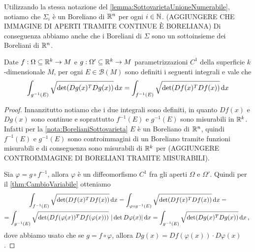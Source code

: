 \begin{remark}\label{nota:BorelianiSottovarieta}
	Utilizzando la stessa notazione del \cref{lemma:SottovarietaUnioneNumerabile}, notiamo che $\Sigma_i$ è un Boreliano di $\mathbb R^n$ per ogni $i\in\mathbb N$. (AGGIUNGERE CHE IMMAGINE DI APERTI TRAMITE CONTINUE È BORELIANA) Di conseguenza abbiamo anche che i Boreliani di $\Sigma$ sono un sottoinsieme dei Boreliani di $\mathbb R^n$.
\end{remark}


\begin{lemma}\label{lemma:InvarianzaImmersione}
	Date $f:\Omega\subseteq\mathbb R^k\to M$ e $g:\Omega'\subseteq\mathbb R^k\to M$ parametrizzazioni $C^1$ della superficie $k$-dimensionale $M$, per ogni $E\in\mathcal{B}(M)$ sono definiti i seguenti integrali e vale che 
	\begin{equation*}
		\int_{g^{-1}(E)}\sqrt{\det(Dg(x)^TDg(x))}\,\mathrm d x=\int_{f^{-1}(E)}\sqrt{\det(Df(x)^TDf(x))}\,\mathrm d x
	\end{equation*}
\end{lemma}
\begin{proof}
	Innanzitutto notiamo che i due integrali sono definiti, in quanto $Df(x)$ e $Dg(x)$ sono continue e soprattutto $f^{-1}(E)$ e $g^{-1}(E)$ sono misurabili in $\mathbb R^k$. Infatti per la \cref{nota:BorelianiSottovarieta} $E$ è un Boreliano di $\mathbb R^n$, quindi $f^{-1}(E)$ e $g^{-1}(E)$ sono controimmagini di un Boreliano tramite funzioni misurabili e di conseguenza sono misurabili di $\mathbb R^k$ per (AGGIUNGERE CONTROIMMAGINE DI BORELIANI TRAMITE MISURABILI). 

	Sia $\varphi=g\circ f^{-1}$, allora $\varphi$ è un diffeomorfismo $C^1$ fra gli aperti $\Omega$ e $\Omega'$. Quindi per il \cref{thm:CambioVariabile} otteniamo
	\begin{multline*}
		\int_{f^{-1}(E)}\sqrt{\det(Df(x)^TDf(x))}\de x=\int_{\varphi\circ g^{-1}(E)}\sqrt{\det(Df(x)^TDf(x))}\de x=\\
		=\int_{g^{-1}(E)}\sqrt{\det(Df(\varphi(x))^TDf(\varphi(x)))}\ |\det D\varphi(x)|\de x=\int_{g^{-1}(E)}\sqrt{\det(Dg(x)^TDg(x))}\de x\virgola
	\end{multline*}
	dove abbiamo usato che se $g=f\circ \varphi$, allora $Dg(x)=Df(\varphi(x))\cdot D\varphi(x)$.
\end{proof}

